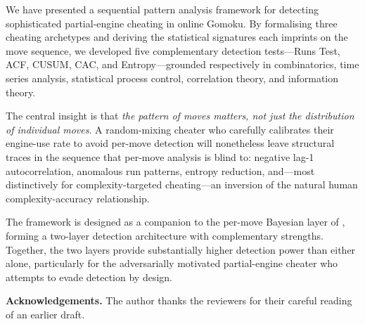 \documentclass[11pt,a4paper]{article}
\begin{document}
We have presented a sequential pattern analysis framework for detecting
sophisticated partial-engine cheating in online Gomoku. By formalising
three cheating archetypes and deriving the statistical signatures each
imprints on the move sequence, we developed five complementary detection
tests---Runs Test, ACF, CUSUM, CAC, and Entropy---grounded respectively
in combinatorics, time series analysis, statistical process control,
correlation theory, and information theory.

The central insight is that \emph{the pattern of moves matters, not just
the distribution of individual moves}. A random-mixing cheater who carefully
calibrates their engine-use rate to avoid per-move detection will nonetheless
leave structural traces in the sequence that per-move analysis is blind to:
negative lag-1 autocorrelation, anomalous run patterns, entropy reduction,
and---most distinctively for complexity-targeted cheating---an inversion
of the natural human complexity-accuracy relationship.

The framework is designed as a companion to the per-move Bayesian layer
of \citet{nguyen2025bayesian}, forming a two-layer detection architecture
with complementary strengths. Together, the two layers provide substantially
higher detection power than either alone, particularly for the adversarially
motivated partial-engine cheater who attempts to evade detection by design.

\bigskip
\noindent
\textbf{Acknowledgements.} The author thanks the reviewers for their
careful reading of an earlier draft.
\end{document}
